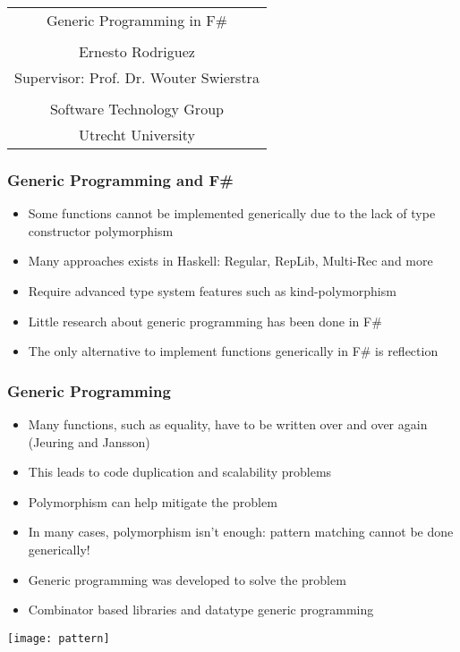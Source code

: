 \documentclass{beamer}
\begin{document}
\begin{frame}

  \begin{tabular}{c}
    {\color{blue}\Huge Generic Programming in F\#} \\
    \\
    Ernesto Rodriguez \\
    Supervisor: Prof. Dr. Wouter Swierstra \\
    \\
    Software Technology Group\\
    Utrecht University
    
  \end{tabular}
  
\end{frame}

\begin{frame}
  \frametitle{Generic Programming and F\#}

  \begin{itemize}
  \item Some functions cannot be implemented generically due to the
    lack of type constructor polymorphism
  \item Many approaches exists in Haskell: Regular, RepLib, Multi-Rec
    and more
  \item Require advanced type system features such as
    kind-polymorphism
  \item Little research about generic programming has been done in F\#
  \item The only alternative to implement functions generically in F\#
    is reflection
  \end{itemize}
    
\end{frame}

\begin{frame}

  \frametitle{Generic Programming}

  \begin{itemize}
  \item Many functions, such as equality, have to be written over and
    over again (Jeuring and Jansson)
  \item This leads to code duplication and scalability problems
  \item Polymorphism can help mitigate the problem
  \item In many cases, polymorphism isn't enough: pattern matching
    cannot be done generically!
  \item Generic programming was developed to solve the problem
  \item Combinator based libraries and datatype generic programming
  \end{itemize}

  \centering \texttt{[image: pattern]} \\
    
\end{frame}
\end{document}

